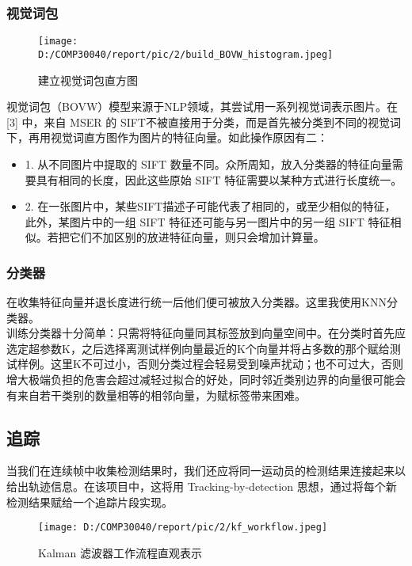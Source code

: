 \documentclass{article}
\begin{document}
\subsubsection{视觉词包}
\begin{figure}
  \centering
  \texttt{[image: D:/COMP30040/report/pic/2/build\_BOVW\_histogram.jpeg]} 
  \caption{建立视觉词包直方图}
\end{figure}
视觉词包（BOVW）模型来源于NLP领域，其尝试用一系列视觉词表示图片。在 [3] 中，来自 MSER 的 SIFT不被直接用于分类，而是首先被分类到不同的视觉词下，再用视觉词直方图作为图片的特征向量。如此操作原因有二：
\begin{itemize}
\item 1. 从不同图片中提取的 SIFT 数量不同。众所周知，放入分类器的特征向量需要具有相同的长度，因此这些原始 SIFT 特征需要以某种方式进行长度统一。
\item 2. 在一张图片中，某些SIFT描述子可能代表了相同的，或至少相似的特征，此外，某图片中的一组 SIFT 特征还可能与另一图片中的另一组 SIFT 特征相似。若把它们不加区别的放进特征向量，则只会增加计算量。
\end{itemize}
\subsubsection{分类器}
在收集特征向量并退长度进行统一后他们便可被放入分类器。这里我使用KNN分类器。\\
训练分类器十分简单：只需将特征向量同其标签放到向量空间中。在分类时首先应选定超参数K，之后选择离测试样例向量最近的K个向量并将占多数的那个赋给测试样例。这里K不可过小，否则分类过程会轻易受到噪声扰动；也不可过大，否则增大极端负担的危害会超过减轻过拟合的好处，同时邻近类别边界的向量很可能会有来自若干类别的数量相等的相邻向量，为赋标签带来困难。
\subsection{追踪}
当我们在连续帧中收集检测结果时，我们还应将同一运动员的检测结果连接起来以给出轨迹信息。在该项目中，这将用 Tracking-by-detection 思想，通过将每个新检测结果赋给一个追踪片段实现。
\begin{figure}
  \centering
  \texttt{[image: D:/COMP30040/report/pic/2/kf\_workflow.jpeg]} 
  \caption{Kalman 滤波器工作流程直观表示}
\end{figure}
\end{document}

